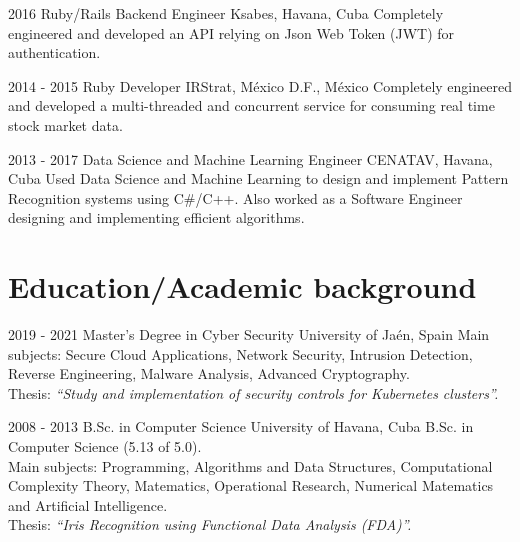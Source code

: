 \documentclass[]{friggeri-cv}
\begin{document}
\begin{entrylist}
  \entry
    {2016}
    {Ruby/Rails Backend Engineer}
    {Ksabes, Havana, Cuba}
    {Completely engineered and developed an API relying on Json Web Token (JWT) for authentication.\\}
  
  \entry
    {2014 - 2015}
    {Ruby Developer}
    {IRStrat, México D.F., México}
    {Completely engineered and developed a multi-threaded and concurrent service for consuming real time stock market data.\\}
    
  \entry
    {2013 - 2017}
    {Data Science and Machine Learning Engineer}
    {CENATAV, Havana, Cuba}
    {Used Data Science and Machine Learning to design and implement Pattern Recognition systems using C\#/C++. Also worked as a Software Engineer designing and implementing efficient algorithms.\\}
\end{entrylist}

\section{Education/Academic background}
\begin{entrylist}
  \entry
    {2019 - 2021}
    {Master's Degree in Cyber Security}
    {University of Jaén, Spain}
    {
    	Main subjects: Secure Cloud Applications, Network Security, Intrusion Detection, Reverse Engineering, Malware Analysis, Advanced Cryptography.\\
      Thesis: \emph{``Study and implementation of security controls for Kubernetes clusters''.}\\
    }

  \entry
    {2008 - 2013}
    {B.Sc. in Computer Science}
    {University of Havana, Cuba}
    {B.Sc. in Computer Science (5.13 of 5.0).\\ Main subjects: Programming, Algorithms and Data Structures, Computational Complexity Theory, Matematics, Operational Research, Numerical Matematics and Artificial Intelligence.\\
    Thesis: \emph{``Iris Recognition using Functional Data Analysis (FDA)''.}}

\end{entrylist}
\end{document}
